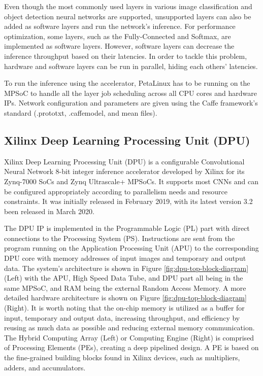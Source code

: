 Even though the most commonly used layers in various image classification and object detection neural networks are supported, unsupported layers can also be added as software layers and run the network's inference. For performance optimization, some layers, such as the Fully-Connected and Softmax, are implemented as software layers. However, software layers can decrease the inference throughput based on their latencies. In order to tackle this problem, hardware and software layers can be run in parallel, hiding each others' latencies.

To run the inference using the accelerator, PetaLinux has to be running on the MPSoC to handle all the layer job scheduling across all CPU cores and hardware IPs. Network configuration and parameters are given using the Caffe framework's standard (.prototxt, .caffemodel, and mean files).

\subsection{Xilinx Deep Learning Processing Unit (DPU)}
Xilinx Deep Learning Processing Unit (DPU) \cite{PG338-Zynq-DPU-IP-Product-Guide} is a configurable Convolutional Neural Network 8-bit integer inference accelerator developed by Xilinx for its Zynq-7000 SoCs and Zynq Ultrascale+ MPSoCs. It supports most CNNs and can be configured appropriately according to parallelism needs and resource constraints. It was initially released in February 2019, with its latest version 3.2 been released in March 2020.

The DPU IP is implemented in the Programmable Logic (PL) part with direct connections to the Processing System (PS). Instructions are sent from the program running on the Application Processing Unit (APU) to the corresponding DPU core with memory addresses of input images and temporary and output data. The system's architecture is shown in Figure \ref{fig:dpu-top-block-diagram} (Left) with the APU, High Speed Data Tube, and DPU part all being in the same MPSoC, and RAM being the external Random Access Memory. A more detailed hardware architecture is shown on Figure \ref{fig:dpu-top-block-diagram} (Right). It is worth noting that the on-chip memory is utilized as a buffer for input, temporary and output data, increasing throughput, and efficiency by reusing as much data as possible and reducing external memory communication. The Hybrid Computing Array (Left) or Computing Engine (Right) is comprised of Processing Elements (PEs), creating a deep pipelined design. A PE is based on the fine-grained building blocks found in Xilinx devices, such as multipliers, adders, and accumulators.

